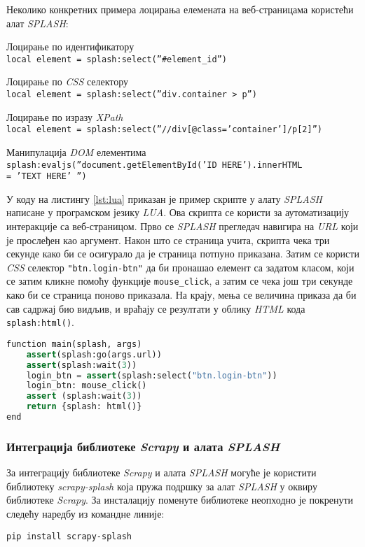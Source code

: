 \documentclass[12pt,oneside]{memoir}
\begin{document}
Неколико конкретних примера лоцирања елемената на веб-страницама користећи алат \textit{SPLASH}:
\begin{description}
    \item Лоцирање по идентификатору\\
        \texttt{local element = splash:select(''\#element\_id'')}
    \item Лоцирање по \textit{CSS} селектору\\   
        \texttt{local element = splash:select(''div.container > p'')}
    \item Лоцирање по изразу \textit{XPath}\\ 
        \texttt{local element = splash:select(''//div[@class='container']/p[2]'')}
    \item Манипулација \textit{DOM} елементима\\
    \texttt{splash:evaljs(''document.getElementById('ID HERE').innerHTML \\= 'TEXT HERE' '')}
\end{description}

У коду на листингу \ref{lst:lua} приказан је пример скрипте у алату \textit{SPLASH} написане у програмском језику \textit{LUA}. Ова скрипта се користи за аутоматизацију интеракције са веб-страницом. Прво се \textit{SPLASH} прегледач навигира на \textit{URL} који је прослеђен као аргумент. Након што се страница учита, скрипта чека три секунде како би се осигурало да је страница потпуно приказана. Затим се користи \textit{CSS} селектор \texttt{"btn.login-btn"} да би пронашао елемент са задатом класом, који се затим кликне помоћу функције \texttt{mouse\_click}, а затим се чека још три секунде како би се страница поново приказала. На крају, мења се величина приказа да би сав садржај био видљив, и враћају се резултати у облику \textit{HTML} кода \texttt{splash:html()}.

\begin{lstlisting}[language=Python, caption={Пример кода програмског језика \textit{LUA}}, label={lst:lua}]
function main(splash, args)
    assert(splash:go(args.url))
    assert(splash:wait(3))
    login_btn = assert(splash:select("btn.login-btn"))
    login_btn: mouse_click()
    assert (splash:wait(3))
    return {splash: html()}
end
\end{lstlisting}

\subsubsection{Интеграција библиотеке \textit{Scrapy} и алата \textit{SPLASH}}
За интеграцију библиотеке \textit{Scrapy} и алата \textit{SPLASH} могуће је користити библиотеку \textit{scrapy-splash} која пружа подршку за алат \textit{SPLASH} у оквиру библиотеке \textit{Scrapy}. За инсталацију поменуте библиотеке неопходно је покренути следећу наредбу из командне линије:
\begin{verbatim}
pip install scrapy-splash
\end{verbatim}
\end{document}
